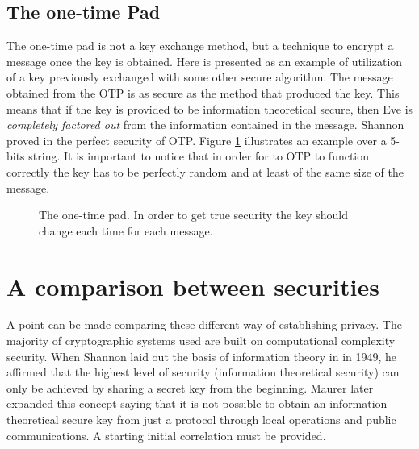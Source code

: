 	\subsection{The one-time Pad}
		
		The one-time pad is not a key exchange method, but a technique to encrypt a message once the key is obtained.
		Here is presented as an example of utilization of a key previously exchanged with some other secure algorithm. 
		The message obtained from the OTP is as secure as the method that produced the key.
		This means that if the key is provided to be information theoretical secure, then Eve is \emph{completely factored out} from the information contained in the message.
		Shannon proved in \cite{Shannon49} the perfect security of OTP.
		Figure \ref{Fig:OTP} illustrates an example over a 5-bits string.
		It is important to notice that in order for to OTP to function correctly the key has to be perfectly random and at least of the same size of the message.
		
		\begin{figure}[h!]
			\centering
			
			\caption{The one-time pad. In order to get true security the key should change each time for each message.}
			\label{Fig:OTP}
		\end{figure}
\section{A comparison between securities}\label{comparison}
    A point can be made comparing these different way of establishing privacy.
    The majority of cryptographic systems used are built on computational complexity security. 
	When Shannon laid out the basis of information theory in \cite{Shannon49} in 1949, he affirmed that the highest level of security (information theoretical security) can only be achieved by sharing a secret key from the beginning.
	Maurer later expanded this concept saying that it is not possible to obtain an information theoretical secure key from just a protocol through local operations and public communications\cite{Maur93}. A starting initial correlation must be provided.\\
	 
